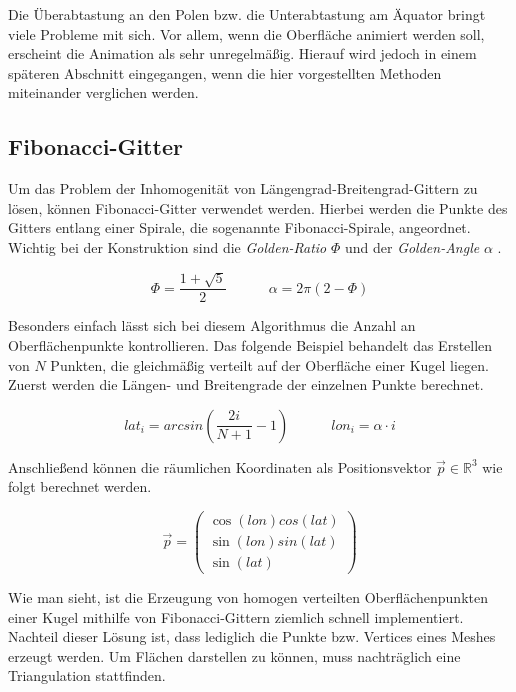 Die Überabtastung an den Polen bzw. die Unterabtastung am Äquator bringt viele
Probleme mit sich. Vor allem, wenn die Oberfläche animiert werden soll,
erscheint die Animation als sehr unregelmäßig. Hierauf wird jedoch in einem
späteren Abschnitt eingegangen, wenn die hier vorgestellten Methoden miteinander
verglichen werden.

\subsection{Fibonacci-Gitter}
Um das Problem der Inhomogenität von Längengrad-Breitengrad-Gittern zu lösen,
können Fibonacci-Gitter verwendet werden. Hierbei werden die Punkte des Gitters
entlang einer Spirale, die sogenannte Fibonacci-Spirale, angeordnet. Wichtig bei
der Konstruktion sind die \textit{Golden-Ratio} $\Phi$ und der
\textit{Golden-Angle} $\alpha$ \cite{Gonzalez2009, Marques2013}.

$$\Phi = \frac{1 + \sqrt{5}}{2} \quad\quad\quad \alpha = 2\pi\left(2 - \Phi\right)$$

Besonders einfach lässt sich bei diesem Algorithmus die Anzahl an Oberflächenpunkte
kontrollieren. Das folgende Beispiel behandelt das Erstellen von $N$ Punkten,
die gleichmäßig verteilt auf der Oberfläche einer Kugel liegen. Zuerst werden
die Längen- und Breitengrade der einzelnen Punkte berechnet.

$$lat_i = arcsin\left(\frac{2i}{N + 1} - 1\right) \quad\quad\quad
lon_i = \alpha \cdot i$$

Anschließend können die räumlichen Koordinaten als Positionsvektor $\vec{p} \in
\mathbb{R}^3$ wie folgt berechnet werden.

\[
\vec{p} =
\left(\begin{array}{c}
    \cos\left(lon\right) cos\left(lat\right) \\
    \sin\left(lon\right) sin\left(lat\right) \\
    \sin\left(lat\right)
\end{array}\right)
\]

Wie man sieht, ist die Erzeugung von homogen verteilten Oberflächenpunkten einer
Kugel mithilfe von Fibonacci-Gittern ziemlich schnell implementiert. Nachteil
dieser Lösung ist, dass lediglich die Punkte bzw. Vertices eines Meshes erzeugt
werden. Um Flächen darstellen zu können, muss nachträglich eine Triangulation
stattfinden. 

